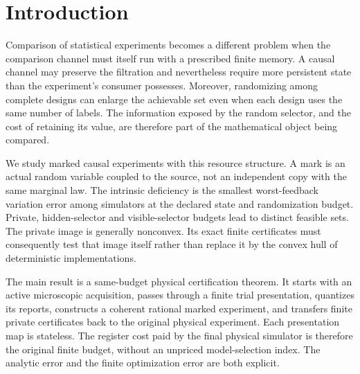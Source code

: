 \section{Introduction}
\label{sec:v15-introduction}
Comparison of statistical experiments becomes a different problem when
the comparison channel must itself run with a prescribed finite memory.
A causal channel may preserve the filtration and nevertheless require
more persistent state than the experiment's consumer possesses. Moreover,
randomizing among complete designs can enlarge the achievable set even
when each design uses the same number of labels. The information exposed
by the random selector, and the cost of retaining its value, are therefore
part of the mathematical object being compared.

We study marked causal experiments with this resource structure. A mark
is an actual random variable coupled to the source, not an independent
copy with the same marginal law. The intrinsic deficiency is the smallest
worst-feedback variation error among simulators at the declared state
and randomization budget. Private, hidden-selector and visible-selector
budgets lead to distinct feasible sets. The private image is generally
nonconvex. Its exact finite certificates must consequently test that
image itself rather than replace it by the convex hull of deterministic
implementations.

The main result is a same-budget physical certification theorem. It
starts with an active microscopic acquisition, passes through a finite
trial presentation, quantizes its reports, constructs a coherent rational
marked experiment, and transfers finite private certificates back to
the original physical experiment. Each presentation map is stateless.
The register cost paid by the final physical simulator is therefore the
original finite budget, without an unpriced model-selection index.
The analytic error and the finite optimization error are both explicit.

